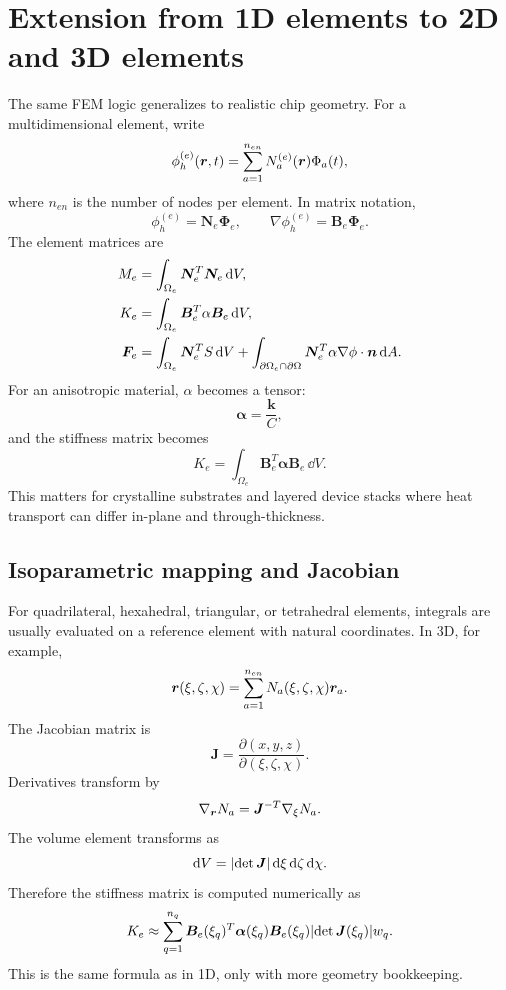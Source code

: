 \documentclass[11pt]{article}
\begin{document}
\section{Extension from 1D elements to 2D and 3D elements}
The same FEM logic generalizes to realistic chip geometry. For a multidimensional element, write
\begin{equation}
    \phi_h^{(e)}(\bm{r},t)=\sum_{a=1}^{n_{en}}N_a^{(e)}(\bm{r})\Phi_a(t),
\end{equation}
where \(n_{en}\) is the number of nodes per element. In matrix notation,
\begin{equation}
    \phi_h^{(e)}=\bm{N}_e\bm{\Phi}_e,
    \qquad
    \nabla\phi_h^{(e)}=\bm{B}_e\bm{\Phi}_e.
\end{equation}
The element matrices are
\begin{align}
    M_e &=\int_{\Omega_e}\bm{N}_e^{T}\bm{N}_e\,\dd V,\\
    K_e &=\int_{\Omega_e}\bm{B}_e^{T}\alpha\bm{B}_e\,\dd V,\\
    \bm{F}_e &=\int_{\Omega_e}\bm{N}_e^{T}S\,\dd V
    +\int_{\partial\Omega_e\cap\partial\Omega}\bm{N}_e^{T}\alpha\nabla\phi\cdot\bm{n}\,\dd A.
\end{align}
For an anisotropic material, \(\alpha\) becomes a tensor:
\begin{equation}
    \bm{\alpha}=\frac{\bm{k}}{C},
\end{equation}
and the stiffness matrix becomes
\begin{equation}
    K_e=\int_{\Omega_e}\bm{B}_e^{T}\bm{\alpha}\bm{B}_e\,\dd V.
\end{equation}
This matters for crystalline substrates and layered device stacks where heat transport can differ in-plane and through-thickness.

\subsection{Isoparametric mapping and Jacobian}
For quadrilateral, hexahedral, triangular, or tetrahedral elements, integrals are usually evaluated on a reference element with natural coordinates. In 3D, for example,
\begin{equation}
    \bm{r}(\xi,\zeta,\chi)=\sum_{a=1}^{n_{en}}N_a(\xi,\zeta,\chi)\bm{r}_a.
\end{equation}
The Jacobian matrix is
\begin{equation}
    \bm{J}=\frac{\partial(x,y,z)}{\partial(\xi,\zeta,\chi)}.
\end{equation}
Derivatives transform by
\begin{equation}
    \nabla_{\bm{r}}N_a=\bm{J}^{-T}\nabla_{\xi}N_a.
\end{equation}
The volume element transforms as
\begin{equation}
    \dd V=\abs{\det\bm{J}}\,\dd\xi\,\dd\zeta\,\dd\chi.
\end{equation}
Therefore the stiffness matrix is computed numerically as
\begin{equation}
    K_e\approx\sum_{q=1}^{n_q}\bm{B}_e(\xi_q)^T\bm{\alpha}(\xi_q)\bm{B}_e(\xi_q)
    \abs{\det\bm{J}(\xi_q)}w_q.
\end{equation}
This is the same formula as in 1D, only with more geometry bookkeeping.
\end{document}
